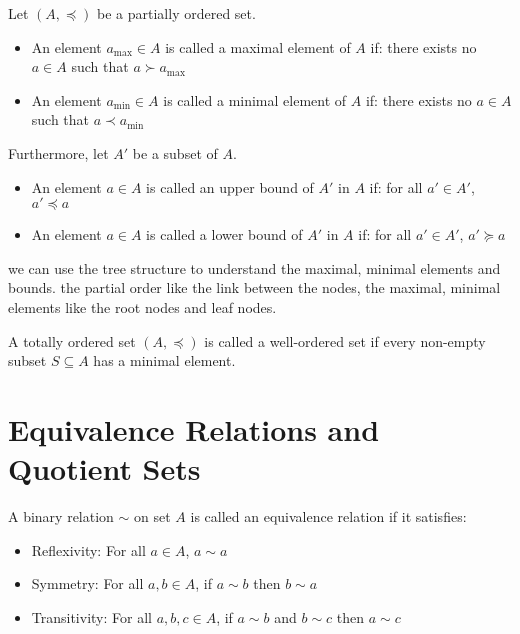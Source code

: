 \documentclass[11pt,lang=en]{elegantbook}
\begin{document}
\begin{definition}
  Let $(A,\preceq)$ be a partially ordered set.
  \begin{itemize}
    \item An element $a_{\max} \in A$ is called a maximal element of $A$ if: there exists no $a \in A$ such that $a \succ a_{\max}$

    \item An element $a_{\min} \in A$ is called a minimal element of $A$ if: there exists no $a \in A$ such that $a \prec a_{\min}$
  \end{itemize}

  Furthermore, let $A'$ be a subset of $A$.
  \begin{itemize}
    \item An element $a \in A$ is called an upper bound of $A'$ in $A$ if: for all $a' \in A'$, $a' \preceq a$

    \item An element $a \in A$ is called a lower bound of $A'$ in $A$ if: for all $a' \in A'$, $a' \succeq a$
  \end{itemize}
\end{definition}

\begin{remark}
  we can use the tree structure to understand the maximal, minimal elements and bounds. the partial order like the link between the nodes, the maximal, minimal elements like the root nodes and leaf nodes.
\end{remark}

\begin{definition}
  A totally ordered set $(A,\preceq)$ is called a well-ordered set if every non-empty subset $S \subseteq A$ has a minimal element.
\end{definition}

\section{Equivalence Relations and Quotient Sets}

\begin{definition}
  A binary relation $\sim$ on set $A$ is called an equivalence relation if it satisfies:
  \begin{itemize}
    \item Reflexivity: For all $a \in A$, $a \sim a$
    \item Symmetry: For all $a,b \in A$, if $a \sim b$ then $b \sim a$
    \item Transitivity: For all $a,b,c \in A$, if $a \sim b$ and $b \sim c$ then $a \sim c$
  \end{itemize}
\end{definition}
\end{document}
